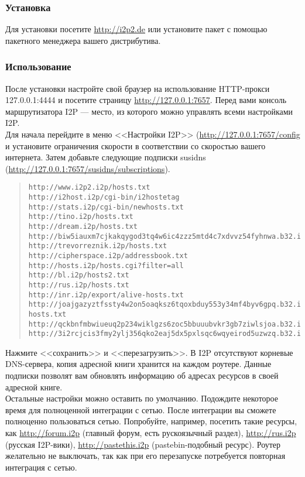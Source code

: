 \subsubsection{Установка}
Для установки посетите \url{http://i2p2.de} или установите пакет с помощью пакетного менеджера вашего дистрибутива.
\subsubsection{Использование}
После установки настройте свой браузер на использование HTTP-прокси 127.0.0.1:4444 и посетите страницу \url{http://127.0.0.1:7657}. Перед вами консоль маршрутизатора I2P --- место, из которого можно управлять всеми настройками I2P.\\
Для начала перейдите в меню <<Настройки I2P>> (\url{http://127.0.0.1:7657/config} и установите ограничения скорости в соответствии со скоростью вашего интернета. Затем добавьте следующие подписки susidns (\url{http://127.0.0.1:7657/susidns/subscriptions}).
\scriptsize\begin{quote}\begin{verbatim}
http://www.i2p2.i2p/hosts.txt
http://i2host.i2p/cgi-bin/i2hostetag
http://stats.i2p/cgi-bin/newhosts.txt
http://tino.i2p/hosts.txt
http://dream.i2p/hosts.txt
http://biw5iauxm7cjkakqygod3tq4w6ic4zzz5mtd4c7xdvvz54fyhnwa.b32.i2p/uncensored_hosts.txt
http://trevorreznik.i2p/hosts.txt
http://cipherspace.i2p/addressbook.txt
http://hosts.i2p/hosts.cgi?filter=all
http://bl.i2p/hosts2.txt
http://rus.i2p/hosts.txt
http://inr.i2p/export/alive-hosts.txt
http://joajgazyztfssty4w2on5oaqksz6tqoxbduy553y34mf4byv6gpq.b32.i2p/export/alive-hosts.txt
http://qckbnfmbwiueuq2p234wiklgzs6zoc5bbuuubvkr3gb7ziwlsjoa.b32.i2p/list.txt
http://3i2rcjcis3fmy2ylj356qko2eaj5dx5pxlsqc6wqyeirod5uzwzq.b32.i2p/hosts.txt
\end{verbatim}\end{quote}\normalsize
Нажмите <<сохранить>> и <<перезагрузить>>. В I2P отсутствуют корневые DNS-сервера, копия адресной книги хранится на каждом роутере. Данные подписки позволят вам обновлять информацию об адресах ресурсов в своей адресной книге.\\
Остальные настройки можно оставить по умолчанию. Подождите некоторое время для полноценной интеграции с сетью. После интеграции вы сможете полноценно пользоваться сетью. Попробуйте, например, посетить такие ресурсы, как \url{http://forum.i2p} (главный форум, есть рускоязычный раздел), \url{http://rus.i2p} (русская I2P-вики), \url{http://pastethis.i2p} (pastebin-подобный ресурс). Роутер желательно не выключать, так как при его перезапуске потребуется повторная интеграция с сетью.
